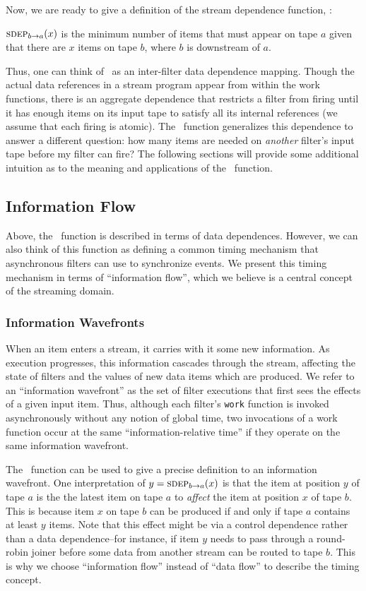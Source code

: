 Now, we are ready to give a definition of the stream dependence
function, \sdep:
\begin{definition}
$\mi{a}{b}(x)$ is the minimum number of items that must appear on tape
 $a$ given that there are $x$ items on tape $b$, where $b$ is
downstream of $a$.
\end{definition}
Thus, one can think of \sdep~as an inter-filter data dependence
mapping.  Though the actual data references in a stream program appear
from within the work functions, there is an aggregate dependence that
restricts a filter from firing until it has enough items on its input
tape to satisfy all its internal references (we assume that each
firing is atomic).  The \sdep~function generalizes this dependence to
answer a different question: how many items are needed on {\it
another} filter's input tape before my filter can fire?  The following
sections will provide some additional intuition as to the meaning and
applications of the \sdep~function.

\subsection{Information Flow}
\label{sec:informationflow}

Above, the \sdep~function is described in terms of data dependences.
However, we can also think of this function as defining a common
timing mechanism that asynchronous filters can use to synchronize
events.  We present this timing mechanism in terms of ``information
flow'', which we believe is a central concept of the streaming domain.

\subsubsection{Information Wavefronts}

When an item enters a stream, it carries with it some new information.
As execution progresses, this information cascades through the stream,
affecting the state of filters and the values of new data items which
are produced.  We refer to an ``information wavefront'' as the set of
filter executions that first sees the effects of a given input item.
Thus, although each filter's {\tt work} function is invoked
asynchronously without any notion of global time, two invocations of a
work function occur at the same ``information-relative time'' if they
operate on the same information wavefront.

The \sdep~function can be used to give a precise definition to an
information wavefront.  One interpretation of $y = \mi{a}{b}(x)$ is
that the item at position $y$ of tape $a$ is the the latest item on
tape $a$ to {\it affect} the item at position $x$ of tape $b$.  This
is because item $x$ on tape $b$ can be produced if and only if tape
$a$ contains at least $y$ items.  Note that this effect might be via a
control dependence rather than a data dependence--for instance, if
item $y$ needs to pass through a round-robin joiner before some data
from another stream can be routed to tape $b$.  This is why we choose
``information flow'' instead of ``data flow'' to describe the timing
concept.

